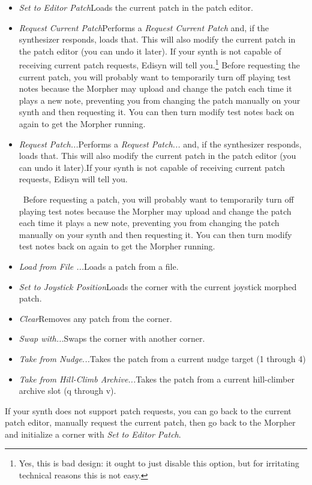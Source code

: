 \documentclass{article}
\begin{document}
\begin{itemize}
\item {\it Set to Editor Patch}\quad Loads the current patch in the patch editor.
\item {\it Request Current Patch}\quad Performs a {\it Request Current Patch} and, if the synthesizer responds, loads that.  This will also modify the current patch in the patch editor (you can undo it later).  If your synth is not capable of receiving current patch requests, Edisyn will tell you.\footnote{Yes, this is bad design: it ought to just disable this option, but for irritating technical reasons this is not easy.}  Before requesting the current patch, you will probably want to temporarily turn off playing test notes because the Morpher may upload and change the patch each time it plays a new note, preventing you from changing the patch manually on your synth and then requesting it.  You can then turn modify test notes back on again to get the Morpher running.
\item {\it Request Patch...}\quad Performs a {\it Request Patch...} and, if the synthesizer responds, loads that.  This will also modify the current patch in the patch editor (you can undo it later).If your synth is not capable of receiving current patch requests, Edisyn will tell you.\addtocounter{footnote}{-1}\footnotemark\ Before requesting a patch, you will probably want to temporarily turn off playing test notes because the Morpher may upload and change the patch each time it plays a new note, preventing you from changing the patch manually on your synth and then requesting it.  You can then turn modify test notes back on again to get the Morpher running.
\item {\it Load from File ...}\quad Loads a patch from a file.
\item {\it Set to Joystick Position}\quad Loads the corner with the current joystick morphed patch.
\item {\it Clear}\quad Removes any patch from the corner.
\item {\it Swap with...}\quad Swaps the corner with another corner.
\item {\it Take from Nudge...}\quad Takes the patch from a current nudge target (1 through 4)
\item {\it Take from Hill-Climb Archive...}\quad Takes the patch from a current hill-climber archive slot (q through v).
\end{itemize}

If your synth does not support patch requests, you can go back to the current patch editor, manually request the current patch, then go back to the Morpher and initialize a corner with {\it Set to Editor Patch}.
\end{document}

